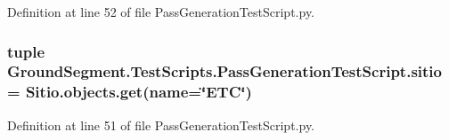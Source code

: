 Definition at line 52 of file Pass\+Generation\+Test\+Script.\+py.

\hypertarget{namespace_ground_segment_1_1_test_scripts_1_1_pass_generation_test_script_ad7a55b577a0c5d1d73f8c590b27082fd}{}
\subsubsection[{sitio}]{\setlength{\rightskip}{0pt plus 5cm}tuple Ground\+Segment.\+Test\+Scripts.\+Pass\+Generation\+Test\+Script.\+sitio = Sitio.\+objects.\+get(name=\char`\"{}E\+T\+C\char`\"{})}\label{namespace_ground_segment_1_1_test_scripts_1_1_pass_generation_test_script_ad7a55b577a0c5d1d73f8c590b27082fd}


Definition at line 51 of file Pass\+Generation\+Test\+Script.\+py.

